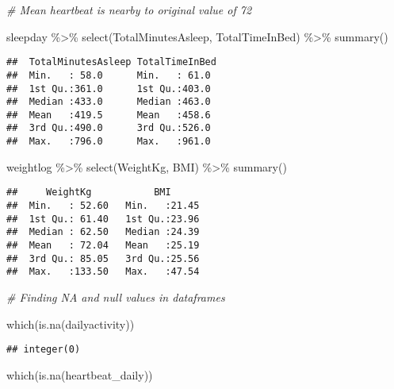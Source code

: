 \documentclass[
]{article}
\newenvironment{Shaded}{\begin{snugshade}}{\end{snugshade}}
\newcommand{\CommentTok}[1]{\textcolor[rgb]{0.56,0.35,0.01}{\textit{#1}}}
\newcommand{\FunctionTok}[1]{\textcolor[rgb]{0.00,0.00,0.00}{#1}}
\newcommand{\NormalTok}[1]{#1}
\newcommand{\SpecialCharTok}[1]{\textcolor[rgb]{0.00,0.00,0.00}{#1}}
\begin{document}
\begin{Shaded}
\begin{Highlighting}[]
\CommentTok{\# Mean heartbeat is nearby to original value of 72}

\NormalTok{sleepday }\SpecialCharTok{\%\textgreater{}\%}
  \FunctionTok{select}\NormalTok{(TotalMinutesAsleep, TotalTimeInBed) }\SpecialCharTok{\%\textgreater{}\%}
\FunctionTok{summary}\NormalTok{()}
\end{Highlighting}
\end{Shaded}

\begin{verbatim}
##  TotalMinutesAsleep TotalTimeInBed 
##  Min.   : 58.0      Min.   : 61.0  
##  1st Qu.:361.0      1st Qu.:403.0  
##  Median :433.0      Median :463.0  
##  Mean   :419.5      Mean   :458.6  
##  3rd Qu.:490.0      3rd Qu.:526.0  
##  Max.   :796.0      Max.   :961.0
\end{verbatim}

\begin{Shaded}
\begin{Highlighting}[]
\NormalTok{weightlog }\SpecialCharTok{\%\textgreater{}\%}
  \FunctionTok{select}\NormalTok{(WeightKg, BMI) }\SpecialCharTok{\%\textgreater{}\%}
\FunctionTok{summary}\NormalTok{()}
\end{Highlighting}
\end{Shaded}

\begin{verbatim}
##     WeightKg           BMI       
##  Min.   : 52.60   Min.   :21.45  
##  1st Qu.: 61.40   1st Qu.:23.96  
##  Median : 62.50   Median :24.39  
##  Mean   : 72.04   Mean   :25.19  
##  3rd Qu.: 85.05   3rd Qu.:25.56  
##  Max.   :133.50   Max.   :47.54
\end{verbatim}

\begin{Shaded}
\begin{Highlighting}[]
\CommentTok{\# Finding NA and null values in dataframes}

\FunctionTok{which}\NormalTok{(}\FunctionTok{is.na}\NormalTok{(dailyactivity))}
\end{Highlighting}
\end{Shaded}

\begin{verbatim}
## integer(0)
\end{verbatim}

\begin{Shaded}
\begin{Highlighting}[]
\FunctionTok{which}\NormalTok{(}\FunctionTok{is.na}\NormalTok{(heartbeat\_daily))}
\end{Highlighting}
\end{Shaded}
\end{document}
